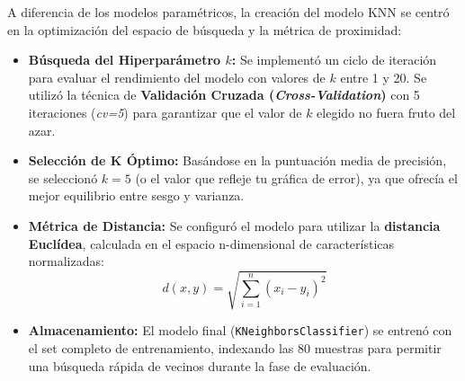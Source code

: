 A diferencia de los modelos paramétricos, la creación del modelo KNN se centró en la optimización del espacio de búsqueda y la métrica de proximidad:

\begin{itemize}
    \item \textbf{Búsqueda del Hiperparámetro $k$:} Se implementó un ciclo de iteración para evaluar el rendimiento del modelo con valores de $k$ entre 1 y 20. Se utilizó la técnica de \textbf{Validación Cruzada (\textit{Cross-Validation})} con 5 iteraciones (\textit{cv=5}) para garantizar que el valor de $k$ elegido no fuera fruto del azar.
    \item \textbf{Selección de K Óptimo:} Basándose en la puntuación media de precisión, se seleccionó $k=5$ (o el valor que refleje tu gráfica de error), ya que ofrecía el mejor equilibrio entre sesgo y varianza.
    \item \textbf{Métrica de Distancia:} Se configuró el modelo para utilizar la \textbf{distancia Euclídea}, calculada en el espacio n-dimensional de características normalizadas:
    \begin{equation}
        d(x, y) = \sqrt{\sum_{i=1}^{n} (x_i - y_i)^2}
    \end{equation}
    \item \textbf{Almacenamiento:} El modelo final (\texttt{KNeighborsClassifier}) se entrenó con el set completo de entrenamiento, indexando las 80 muestras para permitir una búsqueda rápida de vecinos durante la fase de evaluación.
\end{itemize}